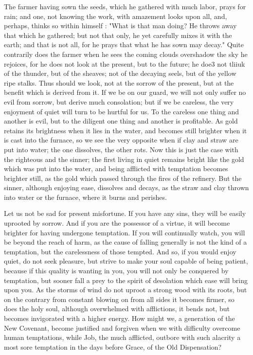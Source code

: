 {The farmer having sown the seeds, which he gathered with much labor, prays for rain; and 
one, not knowing the work, with amazement 
looks upon all, and, perhaps, thinks so within 
himself : "What is that man doing? He throws 
away that which he gathered; but not that only, 
he yet carefully mixes it with the earth; and 
that is not all, for he prays that what he has 
sown may decay." Quite contrarily does the 
farmer when he sees the coming clouds overshadow
the sky he rejoices, for he does not look 
at the present, but to the future; he doe3 not 
tliiuk of the thunder, but of the sheaves; not of 
the decaying seels, but of the yellow ripe stalks. 
Thus should we look, not at the sorrow of the 
present, but at the benefit which is derived from 
it. If we be on our guard, we will not only 
suffer no evil from sorrow, but derive much consolation;
but if we be careless, the very enjoyment
of quiet will turn to be hurtful for us. To 
the careless one thing and another is evil, but 
to the diligent one thing and another is profitable.
As gold retains its brightness when it lies 
in the water, and becomes still brighter when it 
is cast into the furnace, so we see the very opposite
when if clay and straw are put into water; 
the one dissolves, the other rots. Now this is 
just the case with the righteous and the sinner; 
the first living in quiet remains bright like the 
gold which was put into the water, and being 
afflicted with temptation becomes brighter still, 
as the gold which passed through the fires of 
the refinery. But the sinner, although enjoying 
ease, dissolves and decays, as the straw and clay 
thrown into water or the furnace, where it burns 
and perishes. 

Let us not be sad for present misfortune. If 
you have any sins, they will be easily uprooted 
by sorrow. And if you are the possessor of a 
virtue, it will become brighter for having undergone
temptation. If you will continually watch, 
you will be beyond the reach of harm, as the 
cause of falling generally is not the kind of 
a temptation, but the carelessness of those 
tempted. And so, if you would enjoy quiet, do 
not seek pleasure, but strive to make your soul 
capable of being patient, because if this quality 
is wanting in you, you will not only be conquered
by temptation, but sooner fall a prey to 
the spirit of desolation which ease will bring 
upon you. As the storms of wind do not uproot 
a strong wood with its roots, but on the contrary 
from constant blowing on from all sides it becomes
firmer, so does the holy soul, although 
overwhelmed with afflictions, it bends not, but 
becomes invigorated with a higher energy. How 
might we, a generation of the New Covenant,
become justified and forgiven when we with 
difficulty overcome human temptations, while 
Job, the much afflicted, outbore with such alacrity
a most sore temptation in the days before 
Grace, of the Old Dispensation? 

}
